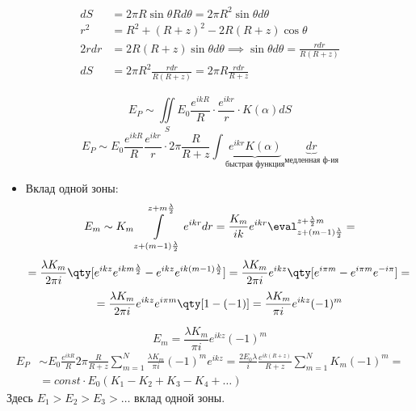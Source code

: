 \begin{align*}
	dS &= 2\pi R \sin \theta R d\theta = 2\pi R^2 \sin \theta d\theta \\
	r^2 &= R^2 + (R+z)^2 - 2R(R+z)\cos\theta \\
	2r dr &= 2R(R+z)\sin\theta d\theta \implies \sin\theta d\theta = \frac{r dr}{R(R+z)} \\
	dS &= 2\pi R^2 \frac{r dr}{R(R+z)} = 2\pi R \frac{r dr}{R+z}
\end{align*}

$$E_P \sim \iint\limits_S E_0 \frac{e^{ikR}}{R} \cdot \frac{e^{ikr}}{r} \cdot K(\alpha) dS$$
$$E_P \sim E_0 \frac{e^{ikR}}{R} \frac{e^{ikr}}{r} \cdot 2\pi \frac{R}{R+z} \int \underbrace{e^{ikr} K(\alpha)}_{\text{быстрая функция}} \underbrace{dr}_{\text{медленная ф-ия}}$$

\begin{figure}[H]
	\centering
\end{figure}

\begin{itemize}
	\item Вклад одной зоны:
	$$E_m \sim K_m \int\limits_{z+(m-1)\frac{\lambda}{2}}^{z+m\frac{\lambda}{2}} e^{ikr} dr = \frac{K_m}{ik} e^{ikr} \eval_{z+(m-1)\frac{\lambda}{2}}^{z+\frac{\lambda}{2}m} =$$
	$$= \frac{\lambda K_m}{2\pi i} \qty[ e^{ikz} e^{ikm\frac{\lambda}{2}} - e^{ikz} e^{ik(m-1)\frac{\lambda}{2}} ] = \frac{\lambda K_m}{2\pi i} e^{ikz} \qty[ e^{i\pi m} - e^{i\pi m} e^{-i\pi} ] = $$
	$$= \frac{\lambda K_m}{2\pi i} e^{ikz} e^{i\pi m} \qty[1 - (-1)] = \frac{\lambda K_m}{\pi i} e^{ikz} (-1)^m$$
\end{itemize}

$$E_m = \frac{\lambda K_m}{\pi i} e^{ikz} (-1)^m$$
\begin{align*}
	E_P &\sim E_0 \frac{e^{ikR}}{R} 2\pi \frac{R}{R+z} \sum_{m=1}^{N} \frac{\lambda K_m}{\pi i} (-1)^m e^{ikz} = \frac{2 E_0 \lambda}{i} \frac{e^{ik(R+z)}}{R+z} \sum_{m=1}^{N} K_m (-1)^m = \\
	&= const \cdot E_0 (K_1 - K_2 + K_3 - K_4 + \dots)
\end{align*}
Здесь $E_1 > E_2 > E_3 > \dots$ вклад одной зоны.

